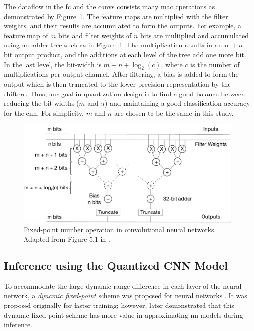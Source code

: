 \documentclass{article}
\begin{document}
The dataflow in the  \gls{fc} and the \gls{conv}s consists many \gls{mac} operations as demonstrated by Figure~\ref{fig:fixed_point_arithmetic}.  
The feature maps are multiplied with the filter weights, and their results are accumulated to form the outputs.
For example, a feature map of $m$ bits and filter weights of $n$ bits are multiplied and accumulated using an adder tree such as in Figure~\ref{fig:fixed_point_arithmetic}.  
The multiplication results in an $m + n$ bit output product, and the additions at each level of the tree add one more bit.
In the last level, the bit-width is $m+n+ \log_2(c)$, where $c$ is the number of multiplications per output channel.  
After filtering, a bias is added to form the output which is then truncated to the lower precision representation by the shifters.
Thus, our goal in quantization design is to find a good balance between reducing the bit-widths ($m$ and $n$) and maintaining a good classification accuracy for the \gls{cnn}.
For simplicity, $m$ and $n$ are chosen to be the same in this study.
%
\begin{figure}
    \centering
    \includegraphics[width=\columnwidth]{fixed_point_arithmetic}
    \caption{Fixed-point number operation in convolutional neural networks. Adapted from Figure 5.1 in \textcite{gysel2016ristretto}.}
    \label{fig:fixed_point_arithmetic}
\end{figure}
%

\subsection{Inference using the Quantized CNN Model}
\label{sec:inference}
%
To accommodate the large dynamic range difference in each layer of the neural network, a \textit{dynamic fixed-point} scheme was proposed for neural networks \autocite{courbariaux2014training}.
It was proposed originally for faster training; however, \textcite{gysel2016hardware} later demonstrated that this dynamic fixed-point scheme has more value in approximating \gls{nn} models during inference.
\end{document}
